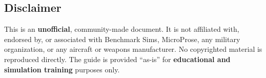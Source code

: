 \documentclass[11pt, a4paper, twoside]{report}
\begin{document}
\subsection{Disclaimer}
\label{sec:C1-S4-S5}

This is an \textbf{unofficial}, community-made document. It is not affiliated with, endorsed by, or associated with Benchmark Sims, MicroProse, any military organization, or any aircraft or weapons manufacturer. No copyrighted material is reproduced directly. The guide is provided ``as-is'' for \textbf{educational and simulation training} purposes only.

\end{document}
